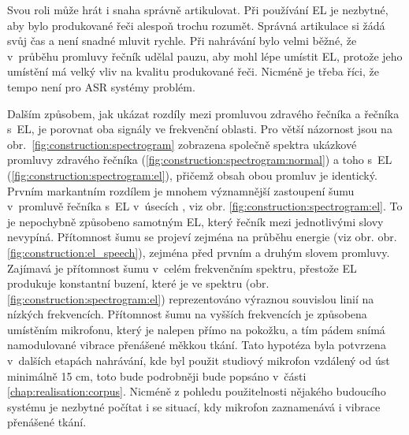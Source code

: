 
Svou roli může hrát i snaha správně artikulovat.
Při používání EL je nezbytné, aby bylo produkované řeči alespoň trochu rozumět.
Správná artikulace si žádá svůj čas a není snadné mluvit rychle.
Při nahrávání bylo velmi běžné, že v~průběhu promluvy řečník udělal pauzu, aby mohl lépe umístit EL, protože jeho umístění má velký vliv na kvalitu produkované řeči.
Nicméně je třeba říci, že tempo není pro ASR systémy problém.

Dalším způsobem, jak ukázat rozdíly mezi promluvou zdravého řečníka a řečníka s~EL, je porovnat oba signály ve frekvenční oblasti.
Pro větší názornost jsou na obr.~\ref{fig:construction:spectrogram} zobrazena společně spektra ukázkové promluvy zdravého řečníka (\ref{fig:construction:spectrogram:normal}) a toho s~EL (\ref{fig:construction:spectrogram:el}), přičemž obsah obou promluv je identický.
Prvním markantním rozdílem je mnohem významnější zastoupení šumu v~promluvě řečníka s~EL v~úsecích , viz obr. \ref{fig:construction:spectrogram:el}.
To je nepochybně způsobeno samotným EL, který řečník mezi jednotlivými slovy nevypíná.
Přítomnost šumu se projeví zejména na průběhu energie (viz obr. obr. \ref{fig:construction:el_speech}), zejména před prvním a druhým slovem promluvy.
Zajímavá je přítomnost šumu v~celém frekvenčním spektru, přestože EL produkuje konstantní buzení, které je ve spektru (obr. \ref{fig:construction:spectrogram:el}) reprezentováno výraznou souvislou linií na nízkých frekvencích.
Přítomnost šumu na vyšších frekvencích je způsobena umístěním mikrofonu, který je nalepen přímo na pokožku, a tím pádem snímá namodulované vibrace přenášené měkkou tkání.
Tato hypotéza byla potvrzena v~dalších etapách nahrávání, kde byl použit studiový mikrofon vzdálený od úst minimálně 15 cm, toto bude podrobněji bude popsáno v~části \ref{chap:realisation:corpus}.
Nicméně z pohledu použitelnosti nějakého budoucího systému je nezbytné počítat i se situací, kdy mikrofon zaznamenává i vibrace přenášené tkání.

